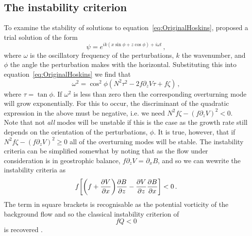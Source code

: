     \subsection{The instability criterion}
    \label{subsec:InstabilityCriterion}
    To examine the stability of solutions to equation~\ref{eq:OriginalHoskins}, \citet{Hoskins1974} proposed a trial solution of the form
    \begin{equation}
        \psi = e^{i k(x\sin\phi + z\cos \phi) + i \omega t} \, ,    
    \end{equation}
    where $\omega$ is the oscillatory frequency of the perturbations, $k$ the wavenumber, and $\phi$ the angle the perturbation makes with the horizontal. Substituting this into equation~\ref{eq:OriginalHoskins} we find that
    \begin{equation}
        \label{eq:GrowthRate}
        \omega^2 = \cos^2\phi (N^2 \tau^2 - 2f\partial_zV\tau + f\zeta) \, ,
    \end{equation}
    where $\tau = \tan\phi$. If $\omega^2$ is less than zero then the corresponding overturning mode will grow exponentially. For this to occur, the discriminant of the quadratic expression in the above must be negative, i.e. we need $N^2 f \zeta - (f\partial_z V)^2 < 0$. Note that not \textit{all} modes will be unstable if this is the case as the growth rate still depends on the orientation of the perturbations, $\phi$. It is true, however, that if $N^2 f \zeta - (f\partial_z V)^2 \geq 0$ all of the overturning modes will be stable. The instability criteria can be simplified somewhat by noting that as the flow under consideration is in geostrophic balance, $f\partial_zV$ = $\partial_x B$, and so we can wewrite the instability criteria as
    \begin{equation}
        f \bigg[\bigg(f + \pdv{V}{x}\bigg)\pdv{B}{z} - \pdv{V}{z}\pdv{B}{x}\bigg] < 0 \, .
    \end{equation}
    The term in square brackets is recognisable as the potential vorticity of the background flow and so the classical instability criterion of
    \begin{equation}
        f Q < 0
    \end{equation}
    is recovered \citep{Hoskins1974}.

